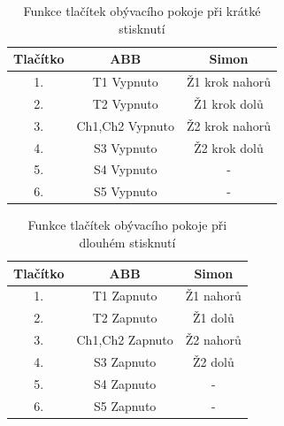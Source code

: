 \begin{table}[h]
 \caption[Funkce tlačítek obývacího pokoje při krátké stisknutí]{Funkce tlačítek obývacího pokoje při krátké stisknutí}
   \small
    \centering
	  \begin{tabular}{|c|c|c|}
	    \hline
	    Tlačítko & ABB & Simon  \\
	    \hline\hline
	    1. & T1 Vypnuto & Ž1 krok nahorů  \\
	    \hline
        2. & T2 Vypnuto & Ž1 krok dolů  \\
	    \hline
        3. & Ch1,Ch2 Vypnuto & Ž2 krok nahorů  \\
	    \hline
        4. & S3 Vypnuto & Ž2 krok dolů  \\
	    \hline
        5. & S4 Vypnuto & - \\
	    \hline 
        6. & S5 Vypnuto & - \\
	    \hline 
	  \end{tabular}
\end{table}

\begin{table}[h]
 \caption[Funkce tlačítek obývacího pokoje při dlouhém stisknutí]{Funkce tlačítek obývacího pokoje při dlouhém stisknutí}
   \small
    \centering
	  \begin{tabular}{|c|c|c|}
	    \hline
	    Tlačítko & ABB & Simon  \\
	    \hline\hline
	    1. & T1 Zapnuto & Ž1 nahorů  \\
	    \hline
        2. & T2 Zapnuto & Ž1 dolů  \\
	    \hline
        3. & Ch1,Ch2 Zapnuto & Ž2 nahorů  \\
	    \hline
        4. & S3 Zapnuto & Ž2 dolů  \\
	    \hline
        5. & S4 Zapnuto & - \\
	    \hline 
        6. & S5 Zapnuto & - \\
	    \hline 
	  \end{tabular}
\end{table}


